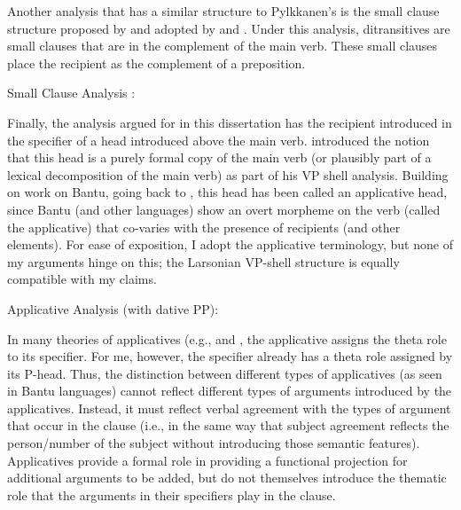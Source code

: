 Another analysis that has a similar structure to Pylkkanen's is the small clause structure proposed by \cite{DenDikken.1995} and adopted by \cite{Harley.2002,Harley.2015} and \cite{Ormazabal.2012}. Under this analysis, ditransitives are small clauses that are in the complement of the main verb. These small clauses place the recipient as the complement of a preposition.

\begin{exe}
	\ex Small Clause Analysis \citep[ simplified from ex. 38]{DenDikken.1995}:\\
\end{exe}

Finally, the analysis argued for in this dissertation has the recipient introduced in the specifier of a head introduced above the main verb. \cite{Larson.1988} introduced the notion that this head is a purely formal copy of the main verb (or plausibly part of a lexical decomposition of the main verb) as part of his VP shell analysis. Building on work on Bantu, going back to \cite{Baker.1988b}, this head has been called an applicative head, since Bantu (and other languages) show an overt morpheme on the verb (called the applicative) that co-varies with the presence of recipients (and other elements). For ease of exposition, I adopt the applicative terminology, but none of my arguments hinge on this; the Larsonian VP-shell structure is equally compatible with my claims. 

\begin{exe}
	\ex Applicative Analysis (with dative PP):\\
\end{exe}

In many theories of applicatives (e.g., \citealt{Pylkkanen.2008} and \citealt{McGinnis.2001}, the applicative assigns the theta role to its specifier. For me, however, the specifier already has a theta role assigned by its P-head. Thus, the distinction between different types of applicatives (as seen in Bantu languages) cannot reflect different types of arguments introduced by the applicatives. Instead, it must reflect verbal agreement with the types of argument that occur in the clause (i.e., in the same way that subject agreement reflects the person/number of the subject without introducing those semantic features). Applicatives provide a formal role in providing a functional projection for additional arguments to be added, but do not themselves introduce the thematic role that the arguments in their specifiers play in the clause.

